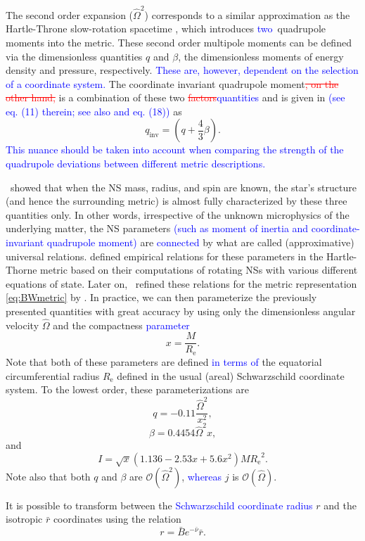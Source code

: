 \documentclass{aa}
\newcommand{\be}{\begin{equation}}
\newcommand{\ee}{\end{equation}}
\newcommand{\refe}[1]{\textcolor{blue}{{#1}}}
\newcommand{\refedel}[1]{\textcolor{red}{\sout{#1}}}
\newcommand{\Req}{\ensuremath{R_{\mathrm{e}}}}
\newcommand{\sch}{Schwarzschild }
\newcommand{\rb}{\ensuremath{\bar{r}}}
\newcommand{\Ob}{\ensuremath{\hat{\Omega}}}
\newcommand{\nub}{\ensuremath{\bar{\nu}}}
\newcommand{\Bb}{\ensuremath{\bar{B}}}
\newcommand{\qinv}{\ensuremath{q_{\mathrm{inv}}}}
\begin{document}
The second order expansion ($\Ob^2$) corresponds to a similar approximation as the Hartle-Throne slow-rotation spacetime \citep{HT68}, which introduces \refe{two} quadrupole moments into the metric.  
These second order multipole moments can be defined via the dimensionless quantities $q$ and $\beta$, the dimensionless moments of energy density and pressure, respectively.
\refe{These are, however, dependent on the selection of a coordinate system.}
The coordinate invariant quadrupole moment\refedel{, on the other hand,} is a combination of these two \refedel{factors}\refe{quantities} and is given in \citet{PA12} \refe{(see eq. (11) therein; see also \citealt{aGM14} and eq. (18))} as
\be
\qinv = \left( q + \frac{4}{3} \beta \right).
\ee
\refe{This nuance should be taken into account when comparing the strength of the quadrupole deviations between different metric descriptions.}


\citet{YY13} showed that when the NS mass, radius, and spin are known, the star's structure (and hence the surrounding metric) is almost fully characterized by these three quantities only. %
In other words, irrespective of the unknown microphysics of the underlying matter, the NS parameters \refe{(such as moment of inertia and coordinate-invariant quadrupole moment)} are \refe{connected} by what are called (approximative) universal relations.
\citet{BBP13} defined empirical relations for these parameters in the Hartle-Thorne metric based on their computations of rotating NSs with various different equations of state.
Later on, \citet{aGM14} refined these relations for the metric representation \eqref{eq:BWmetric} by \citet{BI76}.
In practice, we can then parameterize the previously presented quantities with great accuracy by using only the dimensionless angular velocity $\Ob$ and the compactness \refe{parameter}
\be
x = \frac{M}{\Req}.
\ee
Note that both of these parameters are defined \refe{in terms of} the equatorial circumferential radius $\Req$ defined in the usual (areal) \sch coordinate system.
To the lowest order, these parameterizations are \citep{aGM14}
\be\label{eq:quad}
q = -0.11 \frac{\Ob^2}{x^2},
\ee
\be\label{eq:beta}
\beta = 0.4454 \Ob^2 x,
\ee
and
\be\label{eq:I}
I = \sqrt{x} (1.136 - 2.53 x + 5.6 x^2) M \Req^2.
\ee
Note also that both $q$ and $\beta$ are $\mathcal{O}(\Ob^2)$, \refe{whereas} $j$ is $\mathcal{O}(\Ob)$.
    
It is possible to transform between the \refe{\sch coordinate radius} $r$ and the isotropic $\rb$ coordinates using the relation \citep{FIP86}
\be\label{eq:rb2r}
r = \Bb e^{-\nub} \rb.
\ee
\end{document}
